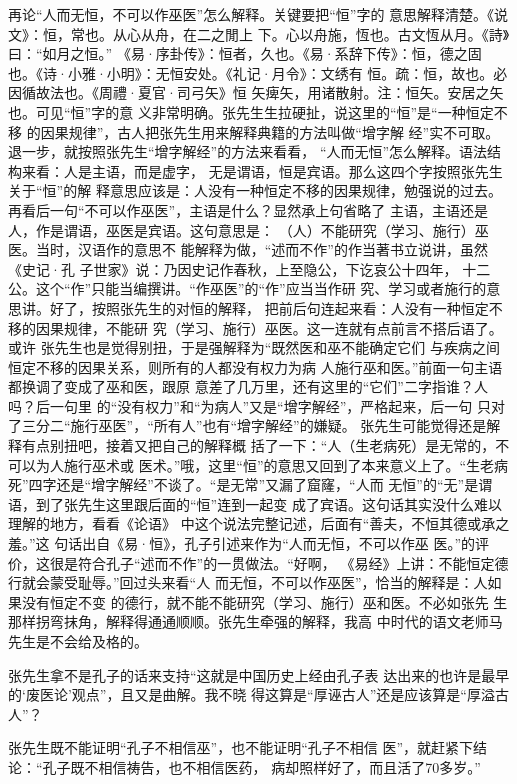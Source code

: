 再论“人而无恒，不可以作巫医”怎么解释。关键要把“恒”字的
意思解释清楚。《说文》：恒，常也。从心从舟，在二之閒上
下。心以舟施，恆也。古文恆从月。《詩》曰：“如月之恒。”
《易·序卦传》：恒者，久也。《易·系辞下传》：恒，德之固
也。《诗·小雅·小明》：无恒安处。《礼记·月令》：文绣有
恒。疏：恒，故也。必因循故法也。《周禮·夏官·司弓矢》恒
矢痺矢，用诸散射。注：恒矢。安居之矢也。可见“恒”字的意
义非常明确。张先生生拉硬扯，说这里的“恒”是“一种恒定不移
的因果规律”，古人把张先生用来解释典籍的方法叫做“增字解
经”实不可取。退一步，就按照张先生“增字解经”的方法来看看，
“人而无恒”怎么解释。语法结构来看：人是主语，而是虚字，
无是谓语，恒是宾语。那么这四个字按照张先生关于“恒”的解
释意思应该是：人没有一种恒定不移的因果规律，勉强说的过去。
再看后一句“不可以作巫医”，主语是什么？显然承上句省略了
主语，主语还是人，作是谓语，巫医是宾语。这句意思是：
（人）不能研究（学习、施行）巫医。当时，汉语作的意思不
能解释为做，“述而不作”的作当著书立说讲，虽然《史记·孔
子世家》说：乃因史记作春秋，上至隐公，下讫哀公十四年，
十二公。这个“作”只能当编撰讲。“作巫医”的“作”应当当作研
究、学习或者施行的意思讲。好了，按照张先生的对恒的解释，
把前后句连起来看：人没有一种恒定不移的因果规律，不能研
究（学习、施行）巫医。这一连就有点前言不搭后语了。或许
张先生也是觉得别扭，于是强解释为“既然医和巫不能确定它们
与疾病之间恒定不移的因果关系，则所有的人都没有权力为病
人施行巫和医。”前面一句主语都换调了变成了巫和医，跟原
意差了几万里，还有这里的“它们”二字指谁？人吗？后一句里
的“没有权力”和“为病人”又是“增字解经”，严格起来，后一句
只对了三分二“施行巫医”，“所有人”也有“增字解经”的嫌疑。
张先生可能觉得还是解释有点别扭吧，接着又把自己的解释概
括了一下：“人（生老病死）是无常的，不可以为人施行巫术或
医术。”哦，这里“恒”的意思又回到了本来意义上了。“生老病
死”四字还是“增字解经”不谈了。“是无常”又漏了窟窿，“人而
无恒”的“无”是谓语，到了张先生这里跟后面的“恒”连到一起变
成了宾语。这句话其实没什么难以理解的地方，看看《论语》
中这个说法完整记述，后面有“善夫，不恒其德或承之羞。”这
句话出自《易·恒》，孔子引述来作为“人而无恒，不可以作巫
医。”的评价，这很是符合孔子“述而不作”的一贯做法。“好啊，
《易经》上讲：不能恒定德行就会蒙受耻辱。”回过头来看“人
而无恒，不可以作巫医”，恰当的解释是：人如果没有恒定不变
的德行，就不能不能研究（学习、施行）巫和医。不必如张先
生那样拐弯抹角，解释得通通顺顺。张先生牵强的解释，我高
中时代的语文老师马先生是不会给及格的。

张先生拿不是孔子的话来支持“这就是中国历史上经由孔子表
达出来的也许是最早的‘废医论’观点”，且又是曲解。我不晓
得这算是“厚诬古人”还是应该算是“厚溢古人”？

张先生既不能证明“孔子不相信巫”，也不能证明“孔子不相信
医”，就赶紧下结论：“孔子既不相信祷告，也不相信医药，
病却照样好了，而且活了70多岁。”

